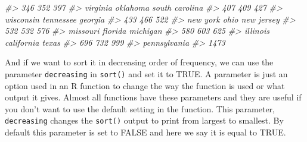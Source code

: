 \documentclass[
  12pt,
]{book}
\newenvironment{Shaded}{\begin{snugshade}}{\end{snugshade}}
\newcommand{\CommentTok}[1]{\textcolor[rgb]{0.56,0.35,0.01}{\textit{#1}}}
\begin{document}
\begin{Shaded}
\begin{Highlighting}[]
\CommentTok{\#>                  346                  352                  397 }
\CommentTok{\#>             virginia             oklahoma       south carolina }
\CommentTok{\#>                  407                  409                  427 }
\CommentTok{\#>            wisconsin            tennessee              georgia }
\CommentTok{\#>                  433                  466                  522 }
\CommentTok{\#>             new york                 ohio           new jersey }
\CommentTok{\#>                  532                  532                  576 }
\CommentTok{\#>             missouri              florida             michigan }
\CommentTok{\#>                  580                  603                  625 }
\CommentTok{\#>             illinois           california                texas }
\CommentTok{\#>                  696                  732                  999 }
\CommentTok{\#>         pennsylvania }
\CommentTok{\#>                 1473}
\end{Highlighting}
\end{Shaded}

And if we want to sort it in decreasing order of frequency, we can use the parameter \texttt{decreasing} in \texttt{sort()} and set it to TRUE. A parameter is just an option used in an R function to change the way the function is used or what output it gives. Almost all functions have these parameters and they are useful if you don't want to use the default setting in the function. This parameter, \texttt{decreasing} changes the \texttt{sort()} output to print from largest to smallest. By default this parameter is set to FALSE and here we say it is equal to TRUE.
\end{document}
